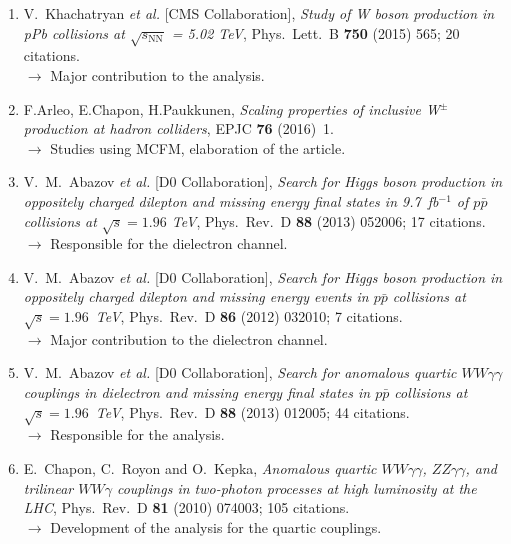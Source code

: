 \documentclass[a4paper,11pt]{article}
\begin{document}
\begin{enumerate}
 \item V.~Khachatryan {\it et al.}  [CMS Collaboration],
  \emph{Study of W boson production in pPb collisions at $\sqrt{s_{\mathrm{NN}}}$ = 5.02 TeV},
  Phys.\ Lett.\ B {\bf 750} (2015) 565; 20 citations.\\
  \hspace{5pt} $\to$ Major contribution to the analysis.
  \item F.Arleo, E.Chapon, H.Paukkunen, \emph{Scaling properties of inclusive W$^\pm$ production at hadron colliders}, 
  EPJC {\bf 76} (2016)~1.\\
  \hspace{5pt} $\to$ Studies using MCFM, elaboration of the article.
 \item V.~M.~Abazov {\it et al.}  [D0 Collaboration],
  \emph{Search for Higgs boson production in oppositely charged dilepton and missing energy final states in 9.7\ 
fb$^{-1}$ of $p\bar{p}$ collisions at
$\sqrt{s} = 1.96$ TeV}, Phys.\ Rev.\ D {\bf 88} (2013) 052006; 17 citations.\\
\hspace{5pt} $\to$ Responsible for the dielectron channel.
 \item V.~M.~Abazov {\it et al.}  [D0 Collaboration],
  \emph{Search for Higgs boson production in oppositely charged dilepton and missing energy events in $p\bar{p}$ 
collisions at $\sqrt{s} =1.96$\ TeV},
  Phys.\ Rev.\ D {\bf 86} (2012) 032010; 7 citations.\\
  \hspace{5pt} $\to$ Major contribution to the dielectron channel.
   \item V.~M.~Abazov {\it et al.}  [D0 Collaboration],
  \emph{Search for anomalous quartic $WW\gamma\gamma$ couplings in dielectron and missing energy final states in 
$p\bar{p}$ collisions at $\sqrt{s} =
1.96$\ TeV}, Phys.\ Rev.\ D {\bf 88} (2013) 012005; 44 citations.\\
\hspace{5pt} $\to$ Responsible for the analysis.
 \item E.~Chapon, C.~Royon and O.~Kepka,
  \emph{Anomalous quartic $W W \gamma \gamma$, $Z Z \gamma \gamma$, and trilinear $WW \gamma$ couplings in two-photon 
processes at 
high luminosity at the LHC},
  Phys.\ Rev.\ D {\bf 81} (2010) 074003; 105 citations.\\
  \hspace{5pt} $\to$ Development of the analysis for the quartic couplings.
\end{enumerate}
\end{document}
